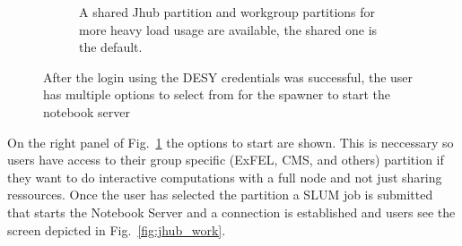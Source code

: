 \documentclass[10pt]{scrartcl}
\begin{document}
\begin{figure}
\begin{subfigure}{0.45\textwidth}
	  \caption{A shared Jhub partition and workgroup partitions for more heavy load usage are available, the shared one is the default.} %
  \end{subfigure}
  \caption{After the login using the DESY credentials was successful, the user has multiple options to select from for the spawner to start the notebook server}
  \label{fig:jhub_spawn}
\end{figure}
%
On the right panel of Fig.~\ref{fig:jhub_spawn} the options to start are shown.
This is neccessary so users have access to their group specific (ExFEL, CMS, and others) partition if they want to do interactive computations with a full node and not just sharing ressources.
Once the user has selected the partition a SLUM job is submitted that starts the Notebook Server and a connection is established and users see the screen depicted in Fig.~\ref{fig:jhub_work}.
%
\end{document}
